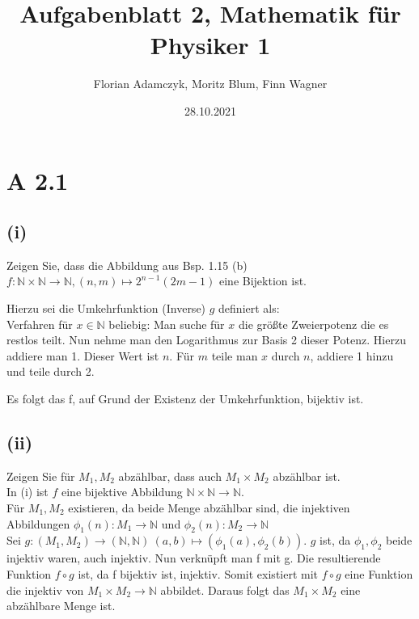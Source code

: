 \documentclass{article}
\date{28.10.2021}
\title{Aufgabenblatt 2, Mathematik für Physiker 1}
\author{Florian Adamczyk, Moritz Blum, Finn Wagner}
\begin{document}
    \maketitle
    
    \section*{A 2.1}
        \subsection*{(i)}
        \large Zeigen Sie, dass die Abbildung aus Bsp. 1.15 (b)
        \(f : \mathbb{N} \times \mathbb{N} \to \mathbb{N}, (n, m) \mapsto 2^{n-1} (2m -1)\)
        eine Bijektion ist.

        Hierzu sei die Umkehrfunktion (Inverse) \(g\) definiert als: \\
        Verfahren für \(x \in \mathbb{N}\) beliebig: 
        Man suche für \(x\) die größte Zweierpotenz die es restlos teilt. Nun nehme man den Logarithmus zur Basis 2 dieser Potenz.
        Hierzu addiere man 1. Dieser Wert ist \(n\).
        Für \(m\) teile man \(x\) durch \(n\), addiere 1 hinzu und teile durch 2.

        Es folgt das f, auf Grund der Existenz der Umkehrfunktion, bijektiv ist.
        
        \subsection*{(ii)}
            Zeigen Sie für \(M_1, M_2\) abzählbar, dass auch \(M_1 \times M_2\) abzählbar ist. \\
            In (i) ist \(f\) eine bijektive Abbildung \(\mathbb{N} \times \mathbb{N} \to \mathbb{N}\). \\
            Für \(M_1, M_2\) existieren, da beide Menge abzählbar sind, die injektiven Abbildungen \(\phi_1(n): M_1 \to \mathbb{N}\) und \(\phi_2(n): M_2 \to \mathbb{N}\) \\
            Sei \(g: (M_1, M_2) \to (\mathbb{N}, \mathbb{N}) \: (a, b) \mapsto (\phi_1(a), \phi_2(b))\).
            \(g\) ist, da \(\phi_1, \phi_2\) beide injektiv waren, auch injektiv.
            Nun verknüpft man f mit g. Die resultierende Funktion \(f \circ g\) ist, da f bijektiv ist, injektiv.
            Somit existiert mit \(f \circ g\) eine Funktion die injektiv von \(M_1 \times M_2 \to \mathbb{N}\) abbildet.
            Daraus folgt das \(M_1 \times M_2\) eine abzählbare Menge ist.
\end{document}
